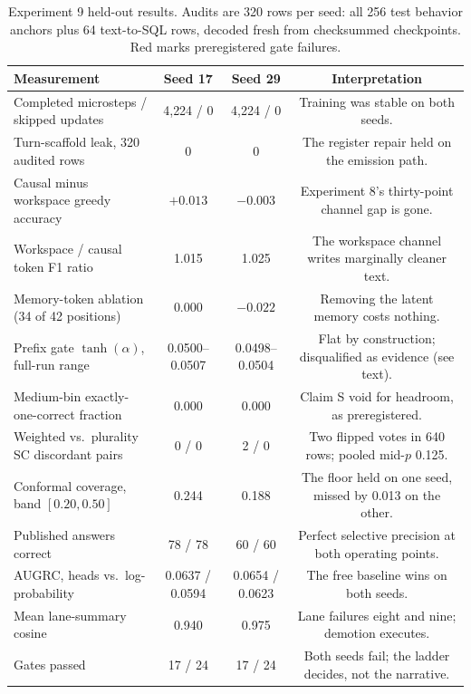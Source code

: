 \documentclass[10pt,a4paper]{article}
\newcommand{\fail}[1]{\textcolor{failred}{#1}}
\begin{document}
\begin{table}[htbp]
\caption{Experiment 9 held-out results. Audits are 320 rows per seed: all 256 test
behavior anchors plus 64 text-to-SQL rows, decoded fresh from checksummed
checkpoints. Red marks preregistered gate failures.}
\label{tab:study9}
\centering\footnotesize
\begin{tabularx}{\textwidth}{@{}Xccc@{}}
\toprule
\textbf{Measurement} & \textbf{Seed 17} & \textbf{Seed 29} & \textbf{Interpretation} \\
\midrule
Completed microsteps / skipped updates & 4{,}224 / 0 & 4{,}224 / 0 & Training was stable on both seeds. \\
Turn-scaffold leak, 320 audited rows & 0 & 0 & The register repair held on the emission path. \\
Causal minus workspace greedy accuracy & $+0.013$ & $-0.003$ & Experiment 8's thirty-point channel gap is gone. \\
Workspace / causal token F1 ratio & 1.015 & 1.025 & The workspace channel writes marginally cleaner text. \\
Memory-token ablation (34 of 42 positions) & \fail{0.000} & \fail{$-0.022$} & Removing the latent memory costs nothing. \\
Prefix gate $\tanh(\alpha)$, full-run range & 0.0500--0.0507 & 0.0498--0.0504 & Flat by construction; disqualified as evidence (see text). \\
Medium-bin exactly-one-correct fraction & \fail{0.000} & \fail{0.000} & Claim S void for headroom, as preregistered. \\
Weighted vs.\ plurality SC discordant pairs & 0 / 0 & 2 / 0 & Two flipped votes in 640 rows; pooled mid-$p$ 0.125. \\
Conformal coverage, band $[0.20, 0.50]$ & 0.244 & \fail{0.188} & The floor held on one seed, missed by 0.013 on the other. \\
Published answers correct & 78 / 78 & 60 / 60 & Perfect selective precision at both operating points. \\
AUGRC, heads vs.\ log-probability & \fail{0.0637 / 0.0594} & \fail{0.0654 / 0.0623} & The free baseline wins on both seeds. \\
Mean lane-summary cosine & \fail{0.940} & \fail{0.975} & Lane failures eight and nine; demotion executes. \\
Gates passed & 17 / 24 & 17 / 24 & Both seeds fail; the ladder decides, not the narrative. \\
\bottomrule
\end{tabularx}
\end{table}
\end{document}
